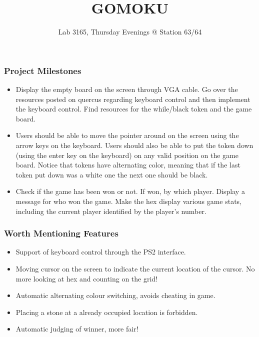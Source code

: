 \documentclass{beamer}
\title{GOMOKU}
\author{Lab 3165, Thursday Evenings @ Station 63/64}
\institute{University of Toronto}
\begin{document}
\maketitle

\newpage
\begin{frame}
\frametitle{Project Milestones}

\begin{itemize}
    \item Display the empty board on the screen through VGA cable. Go over the resources posted on quercus regarding keyboard control and then implement the keyboard control. Find resources for the while/black token and the game board.\newline
    \item Users should be able to move the pointer around on the screen using the arrow keys on the keyboard. Users should also be able to put the token down (using the enter key on the keyboard) on any valid position on the game board. Notice that tokens have alternating color, meaning that if the last token put down was a white one the next one should be black. \newline
    \item Check if the game has been won or not. If won, by which player. Display a message for who won the game. Make the hex display various game stats, including the current player identified by the player’s number.
\end{itemize}
\end{frame}

\begin{frame}
    \frametitle{Worth Mentioning Features}
    \begin{itemize}
        \item Support of keyboard control through the PS2 interface.
        \item Moving cursor on the screen to indicate the current location of the cursor. No more looking at hex and counting on the grid!
        \item Automatic alternating colour switching, avoids cheating in game.
        \item Placing a stone at a already occupied location is forbidden.
        \item Automatic judging of winner, more fair!
    \end{itemize}
\end{frame}
\end{document}
